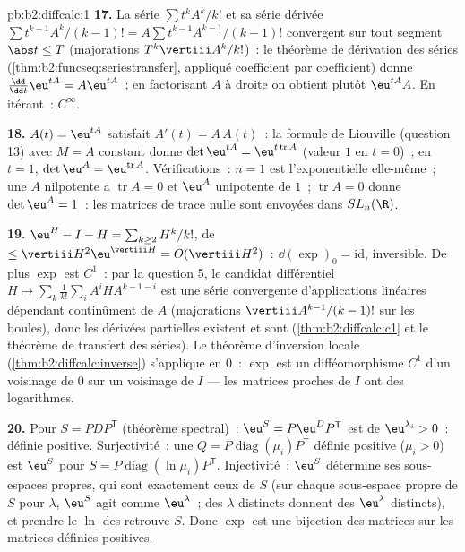 \begin{solution}{pb:b2:diffcalc:1}
\textbf{17.} La série $\sum t^kA^k/k!$ et sa série dérivée
$\sum t^{k-1}A^k/(k-1)! = A\sum t^{k-1}A^{k-1}/(k-1)!$ convergent
 sur tout segment $\abs t \leq T$ (majorations
$T^k\vertiii A^k/k!$)~: le théorème de dérivation des séries
(\cref{thm:b2:funcseq:seriestransfer}, appliqué coefficient par
coefficient) donne $\frac{\dd}{\dd t}\eu^{tA} = A\eu^{tA}$~; en
factorisant $A$ à droite on obtient plutôt $\eu^{tA}A$. En itérant~:
$C^\infty$.

\textbf{18.} $A(t) = \eu^{tA}$ satisfait $A'(t) = A\,A(t)$~:
la formule de Liouville (question 13) avec $M = A$ constant donne
$\det\eu^{tA} = \eu^{t\operatorname{tr}A}$ (valeur $1$ en $t =
0$)~; en $t = 1$, $\det\eu^A = \eu^{\operatorname{tr}A}$.
Vérifications~: $n = 1$ est l'exponentielle elle-même~; une $A$
nilpotente a $\operatorname{tr}A = 0$ et $\eu^A$ unipotente de
 $1$~; $\operatorname{tr}A = 0$ donne $\det\eu^A = 1$~:
les matrices de trace nulle sont envoyées dans $SL_n(\R)$.

\textbf{19.} $\eu^H - I - H = \sum_{k\geq2}H^k/k!$, de 
$\leq \vertiii H^2\eu^{\vertiii H} = O(\vertiii H^2)$~:
$\dd(\exp)_0 = \mathrm{id}$, inversible. De plus $\exp$ est
$C^1$~: par la question 5, le candidat différentiel $H \mapsto
\sum_k\frac1{k!}\sum_iA^iHA^{k-1-i}$ est une série 
convergente d'applications linéaires dépendant continûment de $A$
(majorations $\vertiii A^{k-1}/(k-1)!$ sur les boules), donc les
dérivées partielles existent et sont 
(\cref{thm:b2:diffcalc:c1} et le théorème de transfert des séries).
Le théorème d'inversion locale
(\cref{thm:b2:diffcalc:inverse}) s'applique en $0$~: $\exp$ est un
difféomorphisme $C^1$ d'un voisinage de $0$ sur un voisinage de $I$
--- les matrices proches de $I$ ont des logarithmes.

\textbf{20.} Pour $S = PDP^{\mathsf T}$  (théorème
spectral)~: $\eu^S = P\eu^DP^{\mathsf T}$ est  de
 $\eu^{\lambda_i} > 0$~: définie positive.
Surjectivité~: une $Q =
P\operatorname{diag}(\mu_i)P^{\mathsf T}$ définie positive ($\mu_i > 0$)
est $\eu^S$ pour $S = P\operatorname{diag}(\ln\mu_i)P^{\mathsf T}$.
Injectivité~: $\eu^S$ détermine ses sous-espaces propres, qui sont
exactement ceux de $S$ (sur chaque sous-espace propre de $S$ pour
$\lambda$, $\eu^S$ agit comme $\eu^\lambda$~; des $\lambda$ distincts
donnent des $\eu^\lambda$ distincts), et prendre le $\ln$ des  retrouve $S$. Donc $\exp$ est une bijection des matrices
 sur les matrices définies positives.


\end{solution}
